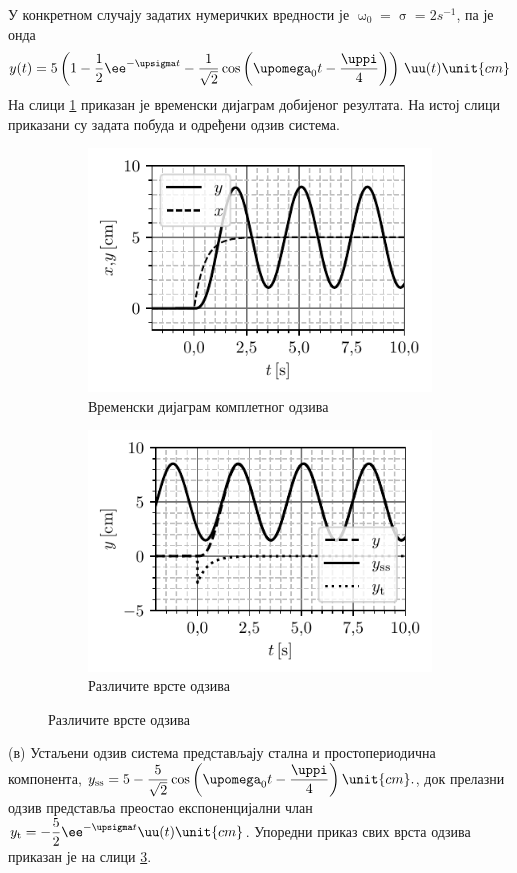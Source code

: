 У конкретном случају задатих нумеричких вредности је  
$\upomega_0 = \upsigma = 2\unit{s^{-1}}$, па је онда 
\begin{equation}
    y(t) = 5 \left( 1 - \dfrac{1}{2} \ee^{-\upsigma t} - \dfrac{1}{\sqrt 2} \cos\left(\upomega_0 t - \dfrac{\uppi}{4} \right) \right) \, \uu(t) \unit{cm}
\end{equation}
На слици \ref{fig:\ID.rez} приказан је временски дијаграм добијеног резултата. На истој слици приказани су 
задата побуда и одређени одзив система.

\begin{figure}[ht!]
    \centering
    \begin{subfigure}{0.49\textwidth}
        \includegraphics{fig/cim_rez_plot.pdf}
        \caption{Временски дијаграм комплетног одзива}
        \label{fig:\ID.rez}    
    \end{subfigure}
    \begin{subfigure}{0.49\textwidth}
        \includegraphics{fig/cim_rez_razni_plot.pdf}
        \caption{Различите врсте одзива}
        \label{fig:\ID.rez2}    
    \end{subfigure}
\end{figure}

(в) Устаљени одзив система представљају стална и простопериодична компонента, 
$y_{\rm ss} = 5 - \dfrac{5}{\sqrt 2} \cos\left(\upomega_0 t - \dfrac{\uppi}{4} \right) \unit{cm}.$, док 
прелазни одзив представља преостао експоненцијални члан 
$y_{\rm t} = - \dfrac{5}{2} \ee^{-\upsigma t} \uu(t) \unit{cm}$. Упоредни приказ свих врста одзива 
приказан је на слици \ref{fig:\ID.rez2}.